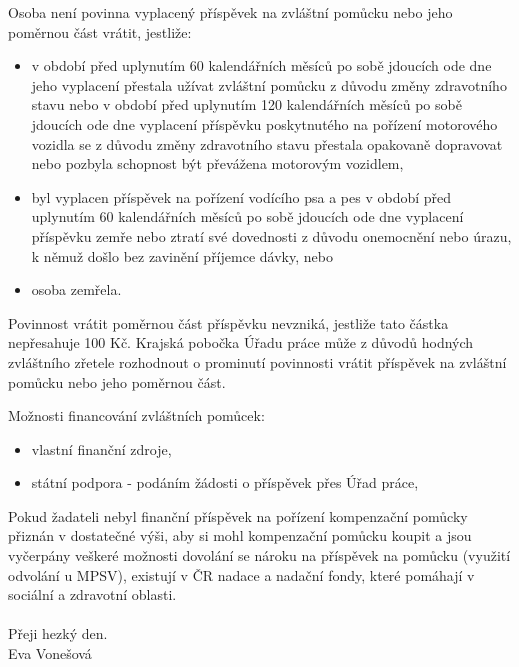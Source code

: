 \documentclass[thesis=M,czech]{FITthesis}[2012/06/26]
\begin{document}
Osoba není povinna vyplacený příspěvek na zvláštní pomůcku nebo jeho
poměrnou část vrátit, jestliže:
\begin{itemize}
    \item v období před uplynutím 60 kalendářních měsíců po sobě jdoucích
ode dne jeho vyplacení přestala užívat zvláštní pomůcku z důvodu změny
zdravotního stavu nebo v období před uplynutím     120 kalendářních měsíců po
sobě jdoucích ode dne vyplacení příspěvku poskytnutého na pořízení
motorového vozidla se z důvodu změny zdravotního stavu přestala opakovaně
dopravovat nebo     pozbyla schopnost být převážena motorovým vozidlem,
    \item byl vyplacen příspěvek na pořízení vodícího psa a pes v období
před uplynutím 60 kalendářních měsíců po sobě jdoucích ode dne vyplacení
příspěvku zemře nebo ztratí své dovednosti z důvodu     onemocnění nebo
úrazu, k němuž došlo bez zavinění příjemce dávky, nebo
    \item osoba zemřela.
\end{itemize}

Povinnost vrátit poměrnou část příspěvku nevzniká, jestliže tato částka
nepřesahuje 100 Kč. Krajská pobočka Úřadu práce může z důvodů hodných
zvláštního zřetele rozhodnout o prominutí povinnosti vrátit příspěvek na
zvláštní pomůcku nebo jeho poměrnou část.

Možnosti financování zvláštních pomůcek:
\begin{itemize}
\item vlastní finanční zdroje,
\item státní podpora - podáním žádosti o příspěvek přes Úřad práce,
\end{itemize}

Pokud žadateli nebyl finanční příspěvek na pořízení kompenzační pomůcky
přiznán v dostatečné výši, aby si mohl kompenzační pomůcku koupit a jsou
vyčerpány veškeré možnosti dovolání se nároku na příspěvek na pomůcku
(využití odvolání u MPSV), existují v ČR nadace a nadační fondy, které
pomáhají v sociální a zdravotní oblasti.
\\\\
Přeji hezký den.
\\
Eva Vonešová
\end{document}
